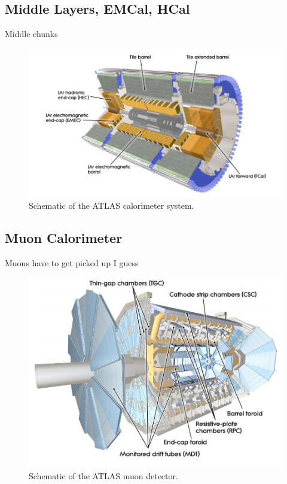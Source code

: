 \subsection{Middle Layers, EMCal, HCal}
Middle chunks 
\begin{figure}[h!]
	\centering
	\includegraphics[width=\columnwidth]{../ThesisImages/LHCImages/ATLASCaloSystem.png}
	\caption{Schematic of the ATLAS calorimeter system.\cite{ATLAS}
	}
	\label{fig:ATLASCaloSys}
\end{figure}




\subsection{Muon Calorimeter}
Muons have to get picked up I guess
\begin{figure}[h!]
	\centering
	\includegraphics[width=\columnwidth]{../ThesisImages/LHCImages/ATLASMuonSystem.png}
	\caption{Schematic of the ATLAS muon detector.\cite{ATLAS}
	}
	\label{fig:ATLASMuonSys}
\end{figure}

